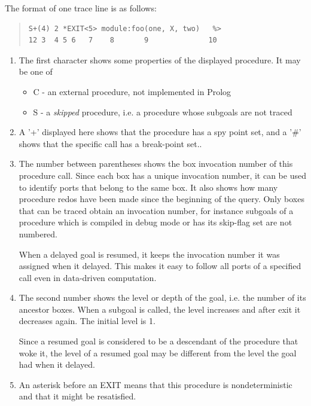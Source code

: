 The format of one trace line is as follows:
\begin{quote}
\begin{verbatim}
S+(4) 2 *EXIT<5> module:foo(one, X, two)   %>
12 3  4 5 6   7    8       9              10
\end{verbatim}
\end{quote}

\begin{enumerate}
\item The first character shows some properties of the
displayed procedure.
It may be one of
\begin{itemize}
\item C - an external procedure, not implemented in Prolog
\item S - a {\it skipped} procedure, i.e. a procedure whose
subgoals are not traced
\end{itemize}

\item A '+' displayed here shows that the procedure has a spy point set,
  and a '\#' shows that the specific call has a break-point set..

\item The number between parentheses shows the box invocation number
of this procedure call.  Since each box has a unique invocation
number, it can be used to identify ports that belong to the same box.
It also shows how many procedure redos have been made since the
beginning of the query.  Only boxes that can be traced obtain an
invocation number, for instance subgoals of a procedure which is
compiled in debug mode or has its skip-flag set are not numbered.

When a delayed goal is resumed, it keeps the invocation number it was
assigned when it delayed.  This makes it easy to follow all ports of a
specified call even in data-driven computation.

\item The second number shows the level or depth of the goal,
i.e. the number of its ancestor boxes.  When a subgoal is called, the
level increases and after exit it decreases again.  The initial level
is 1.

Since a resumed goal is considered to be a descendant of the procedure
that woke it, the level of a resumed goal may be different from
the level the goal had when it delayed.

\item An asterisk before an EXIT means that this
procedure is nondeterministic and that it might be resatisfied.


\end{enumerate}
